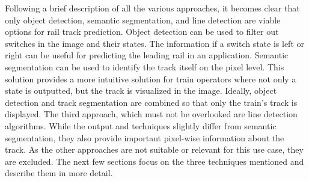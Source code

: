 \clearpage

\noindent Following a brief description of all the various approaches, it becomes clear that only object detection, semantic segmentation, and line detection are viable options for rail track prediction.
Object detection can be used to filter out switches in the image and their states.
The information if a switch state is left or right can be useful for predicting the leading rail in an application.
Semantic segmentation can be used to identify the track itself on the pixel level.
This solution provides a more intuitive solution for train operators where not only a state is outputted, but the track is visualized in the image.
Ideally, object detection and track segmentation are combined so that only the train's track is displayed.
The third approach, which must not be overlooked are line detection algorithms.
While the output and techniques slightly differ from semantic segmentation, they also provide important pixel-wise information about the track.
As the other approaches are not suitable or relevant for this use case, they are excluded. The next few sections focus on the three techniques mentioned and describe them in more detail.